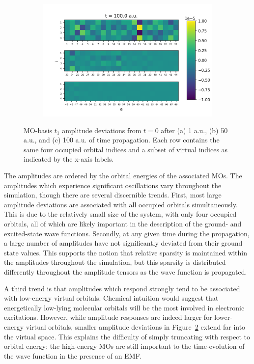 \begin{figure}
\begin{subfigure}{.5\textwidth}
        \centering
        \includegraphics[scale=0.5]{p3/figures/MO_delta_t1_100.png}
        \caption{}
        \label{fig:MO_t1_100}
    \end{subfigure}
    \caption{MO-basis $t_1$ amplitude deviations from $t = 0$ after (a) 1 a.u., (b) 50 a.u., and 
    (c) 100 a.u. of time propagation. Each row contains the same four occupied orbital indices
    and a subset of virtual indices as indicated by the x-axis labels.}
    \label{fig:amps}
\end{figure}
The amplitudes are ordered by the orbital energies of the associated MOs. 
The amplitudes which experience significant oscillations vary throughout the simulation,
though there are several discernible trends. First, most large amplitude deviations
are associated with all occupied orbitals simultaneously. This is due to the relatively small size of 
the system, with only four occupied orbitals, all of which are likely important in the
description of the ground- and excited-state wave functions. Secondly, 
at any given time during the propagation,
a large number of amplitudes have not significantly deviated from their ground state values.
This supports the notion
that relative sparsity is maintained within the amplitudes throughout the simulation,
but this sparsity is distributed differently throughout the amplitude tensors as
the wave function is propagated.  

A third trend is that amplitudes which respond strongly tend to be associated with 
low-energy virtual orbitals. Chemical intuition would suggest that energetically 
low-lying molecular orbitals will be the most involved in electronic excitations.
However, while amplitude responses are indeed larger for lower-energy virtual orbitals, 
smaller amplitude 
deviations in Figure~\ref{fig:amps} extend far into the virtual space. This explains
the difficulty of simply truncating with respect to orbital energy: the 
high-energy MOs are still important to the time-evolution of the wave function 
in the presence of an EMF. 

